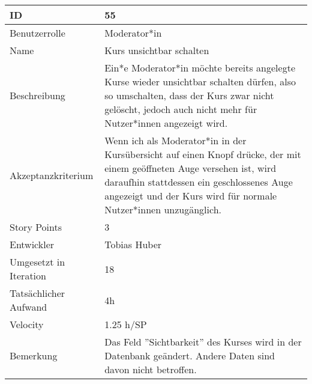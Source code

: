 \begin{tabularx}{\textwidth}{|p{}|X|}
	\hline
	ID & 55\\
	\hline
	Benutzerrolle & Moderator*in\\
	\hline
	Name & Kurs unsichtbar schalten\\
	\hline
	Beschreibung & Ein*e Moderator*in möchte bereits angelegte Kurse wieder unsichtbar schalten dürfen, also so umschalten, dass der Kurs zwar nicht gelöscht, jedoch auch nicht mehr für Nutzer*innen angezeigt wird.\\
	\hline
	Akzeptanzkriterium & Wenn ich als Moderator*in in der Kursübersicht auf einen Knopf drücke, der mit einem geöffneten Auge versehen ist, wird daraufhin stattdessen ein geschlossenes Auge angezeigt und der Kurs wird für normale Nutzer*innen unzugänglich.\\
	\hline
	Story Points & 3\\
	\hline
	Entwickler & Tobias Huber\\
	\hline
	Umgesetzt in Iteration & 18\\
	\hline
	Tatsächlicher Aufwand & 4h\\
	\hline
	Velocity & 1.25 h/SP\\
	\hline
	Bemerkung & Das Feld ''Sichtbarkeit'' des Kurses wird in der Datenbank geändert. Andere Daten sind davon nicht betroffen.\\
	\hline
\end{tabularx}
\vspace{20pt}
